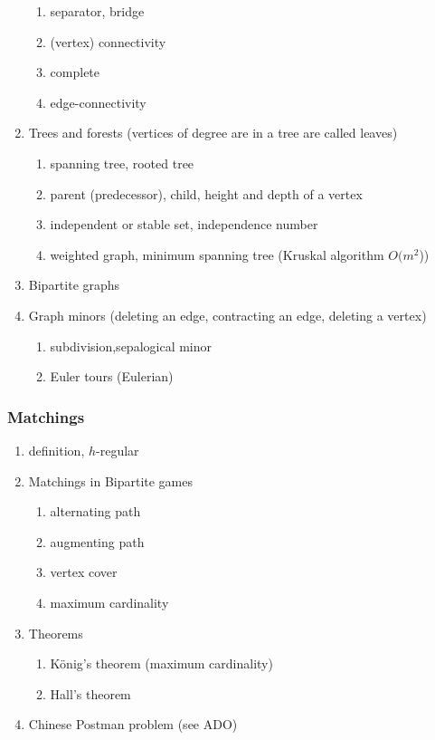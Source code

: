 \documentclass{article}
\begin{document}
\begin{enumerate}
\begin{enumerate}
        \item separator, bridge
        \item (vertex) connectivity
        \item complete
        \item edge-connectivity
    \end{enumerate}
    \item Trees and forests (vertices of degree are in a tree are called leaves)
    \begin{enumerate}
        \item spanning tree, rooted tree
        \item parent (predecessor), child, height and depth of a vertex
        \item independent or stable set, independence number
        \item weighted graph, minimum spanning tree (Kruskal algorithm $O(m^{2}$))
    \end{enumerate}
    \item Bipartite graphs
    \item Graph minors (deleting an edge, contracting an edge, deleting a vertex)
    \begin{enumerate}
        \item subdivision,sepalogical minor
        \item Euler tours (Eulerian)
    \end{enumerate}
\end{enumerate}
\pagestyle{otherpages}
\subsubsection*{Matchings}
\begin{enumerate}
    \item definition, $h$-regular
    \item Matchings in Bipartite games
    \begin{enumerate}
        \item alternating path
        \item augmenting path
        \item vertex cover
        \item maximum cardinality
    \end{enumerate}
    \item Theorems
    \begin{enumerate}
        \item K\"onig's theorem (maximum cardinality)    
        \item Hall's theorem
    \end{enumerate}
    \item Chinese Postman problem (see ADO)
\end{enumerate}
\end{document}

